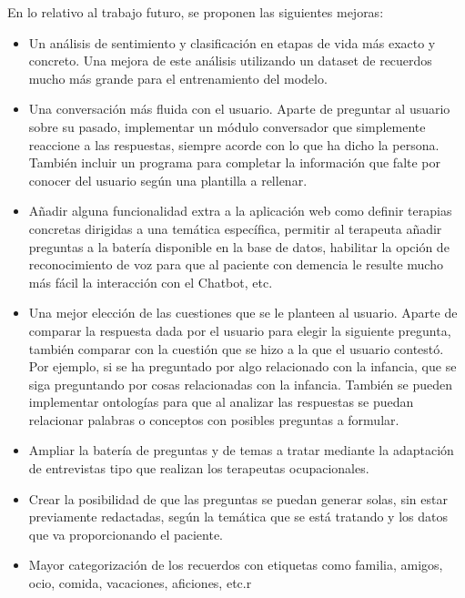 En lo relativo al trabajo futuro, se proponen las siguientes mejoras:
\begin{itemize}
	\item Un análisis de sentimiento y clasificación en etapas de vida más exacto y concreto. Una mejora de este análisis utilizando un dataset de recuerdos mucho más grande para el entrenamiento del modelo. 
	\item Una conversación más fluida con el usuario. Aparte de preguntar al usuario sobre su pasado, implementar un módulo conversador que simplemente reaccione a las respuestas, siempre acorde con lo que ha dicho la persona. También incluir un programa para completar la información que falte por conocer del usuario según una plantilla a rellenar.
	\item Añadir alguna funcionalidad extra a la aplicación web como definir terapias concretas dirigidas a una temática específica, permitir al terapeuta añadir preguntas a la batería disponible en la base de datos, habilitar la opción de reconocimiento de voz para que al paciente con demencia le resulte mucho más fácil la interacción con el Chatbot, etc.
	\item Una mejor elección de las cuestiones que se le planteen al usuario. Aparte de comparar la respuesta dada por el usuario para elegir la siguiente pregunta, también comparar con la cuestión que se hizo a la que el usuario contestó. Por ejemplo, si se ha preguntado por algo relacionado con la infancia, que se siga preguntando por cosas relacionadas con la infancia. También se pueden implementar ontologías para que al analizar las respuestas se puedan relacionar palabras o conceptos con posibles preguntas a formular.
	\item Ampliar la batería de preguntas y de temas a tratar mediante la adaptación de entrevistas tipo que realizan los terapeutas ocupacionales.
	\item Crear la posibilidad de que las preguntas se puedan generar solas, sin estar previamente redactadas, según la temática que se está tratando y los datos que va proporcionando el paciente. 
	\item Mayor categorización de los recuerdos con etiquetas como familia, amigos, ocio, comida, vacaciones, aficiones, etc.r 
\end{itemize}